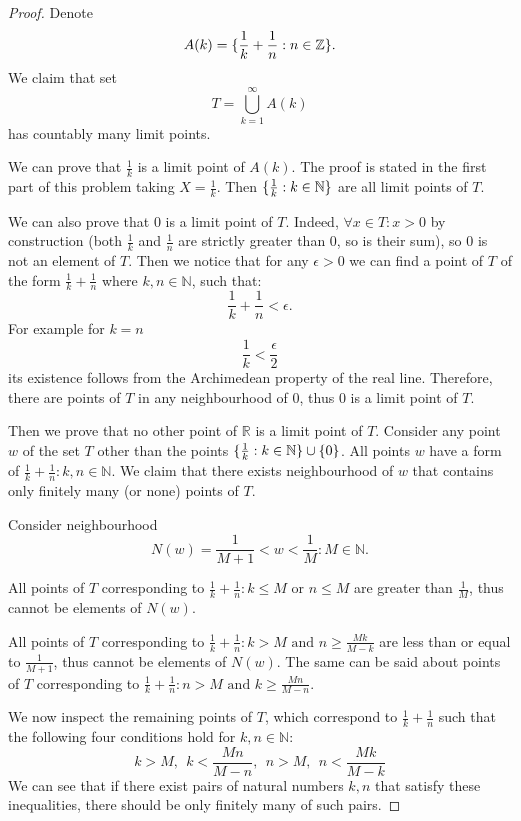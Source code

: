 \documentclass{article}
\newcommand{\R}{\mathbb{R}}
\newcommand{\N}{\mathbb{N}}
\newcommand{\Z}{\mathbb{Z}}
\DeclarePairedDelimiter{\set}{ \{ }{ \} }
\begin{document}
\begin{proof}

Denote
\[ A(k) =  \set{ \dfrac{1}{k} + \dfrac{1}{n} : n \in \Z }. \]
We claim that set
\[ T = \bigcup_{k=1}^{\infty} A(k) \]
has countably many limit points.

We can prove that $\frac{1}{k}$ is a limit point of $A(k)$.
The proof is stated in the first part of this problem taking $X = \frac{1}{k}$.
Then $\set{ \frac{1}{k} : k \in \N }$ are all limit points of $T$.

We can also prove that $0$ is a limit point of $T$.
Indeed, $\forall x \in T: x > 0$ by construction (both $\frac{1}{k}$ and $\frac{1}{n}$ are strictly greater than $0$, so is their sum), so $0$ is not an element of $T$.
Then we notice that for any $\epsilon > 0$ we can find a point of $T$ of the form $\frac{1}{k} + \frac{1}{n}$ where $k,n \in \N$, such that:
\[ \frac{1}{k} + \frac{1}{n} < \epsilon. \]
For example for $k = n$
\[ \frac{1}{k} < \frac{\epsilon}{2} \]
its existence follows from the Archimedean property of the real line.
Therefore, there are points of $T$ in any neighbourhood of $0$, thus $0$ is a limit point of $T$.

Then we prove that no other point of $\R$ is a limit point of $T$. 
Consider any point $w$ of the set $T$ other than the points $\set{ \frac{1}{k} : k \in \N } \cup \set{0}$.
All points $w$ have a form of $\frac{1}{k} + \frac{1}{n}: k,n \in \N$.
We claim that there exists neighbourhood of $w$ that contains only finitely many (or none) points of $T$.

Consider neighbourhood
\[ N(w) = \frac{1}{M+1} < w < \frac{1}{M} : M\in\N. \]

All points of $T$ corresponding to $\frac{1}{k}+\frac{1}{n} : k \leq M \text{ or } n \leq M$ are greater than $\frac{1}{M}$, thus cannot be elements of $N(w)$.

All points of $T$ corresponding to $\frac{1}{k}+\frac{1}{n} : k > M \text{ and } n \geq \frac{Mk}{M-k}$ are less than or equal to $\frac{1}{M+1}$, thus cannot be elements of $N(w)$.
The same can be said about points of $T$ corresponding to $\frac{1}{k}+\frac{1}{n} : n > M \text{ and } k \geq \frac{Mn}{M-n}$.

We now inspect the remaining points of $T$, which correspond to $\frac{1}{k}+\frac{1}{n}$ such that the following four conditions hold for $k, n \in \N$:
\[ k > M, \>\> k < \frac{Mn}{M-n}, \>\> n > M, \>\> n < \frac{Mk}{M-k} \]
We can see that if there exist pairs of natural numbers $k, n$ that satisfy these inequalities, there should be only finitely many of such pairs.


\end{proof}
\end{document}
